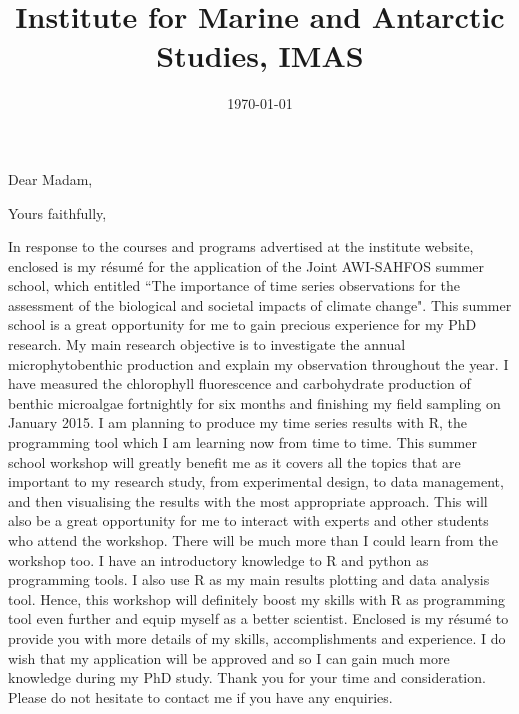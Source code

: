 \documentclass[11pt,a4paper,sans]{moderncv}        %
\title{Institute for Marine and Antarctic Studies, IMAS}                               %
\begin{document}
\date{\today}
\opening{Dear Madam,}
\closing{Yours faithfully,}
\makelettertitle

In response to the courses and programs advertised at the institute website, enclosed is my r{\'e}sum{\'e} for the application of the Joint AWI-SAHFOS summer school, which entitled ``The importance of time series observations for the assessment of the biological and societal impacts of climate change". This summer school is a great opportunity for me to gain precious experience for my PhD research.  \linebreak\newline
My main research objective is to investigate the annual microphytobenthic production and explain my observation throughout the year. I have measured the chlorophyll fluorescence and carbohydrate production of benthic microalgae fortnightly for six months and finishing my field sampling on January 2015. I am planning to produce my time series results with R, the programming tool which I am learning now from time to time.  \linebreak\newline
This summer school workshop will greatly benefit me as it covers all the topics that are important to my research study, from experimental design, to data management, and then visualising the results with the most appropriate approach. This will also be a great opportunity for me to interact with experts and other students who attend the workshop. There will be much more than I could learn from the workshop too.  \linebreak\newline
I have an introductory knowledge to R and python as programming tools. I also use R as my main results plotting and data analysis tool. Hence, this workshop will definitely boost my skills with R as programming tool even further and equip myself as a better scientist.  \linebreak\newline
Enclosed is my r{\'e}sum{\'e} to provide you with more details of my skills, accomplishments and experience. I do wish that my application will be approved and so I can gain much more knowledge during my PhD study.  \linebreak\newline
Thank you for your time and consideration. Please do not hesitate to contact me if you have any enquiries. \linebreak\newline
\makeletterclosing
\end{document}
